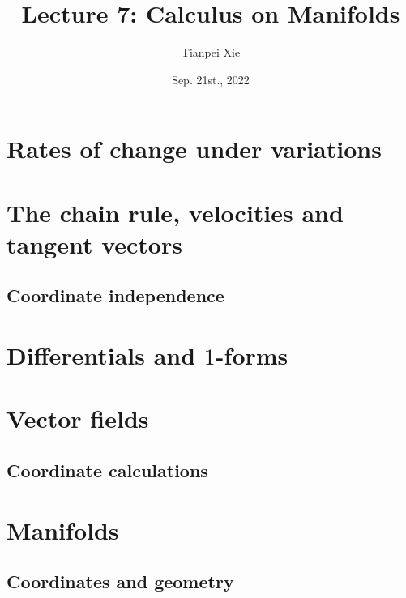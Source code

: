 \documentclass[11pt]{article}
\begin{document}
\title{Lecture 7:  Calculus on Manifolds}
\author{ Tianpei Xie}
\date{ Sep. 21st., 2022 }
\maketitle
\tableofcontents
\newpage
\section{Rates of change under variations}

\section{The chain rule, velocities and tangent vectors}
\subsection{Coordinate independence}

\section{Differentials and $1$-forms}

\section{Vector fields}

\subsection{Coordinate calculations}

\section{Manifolds}
\subsection{Coordinates and geometry}
\newpage


\end{document}
